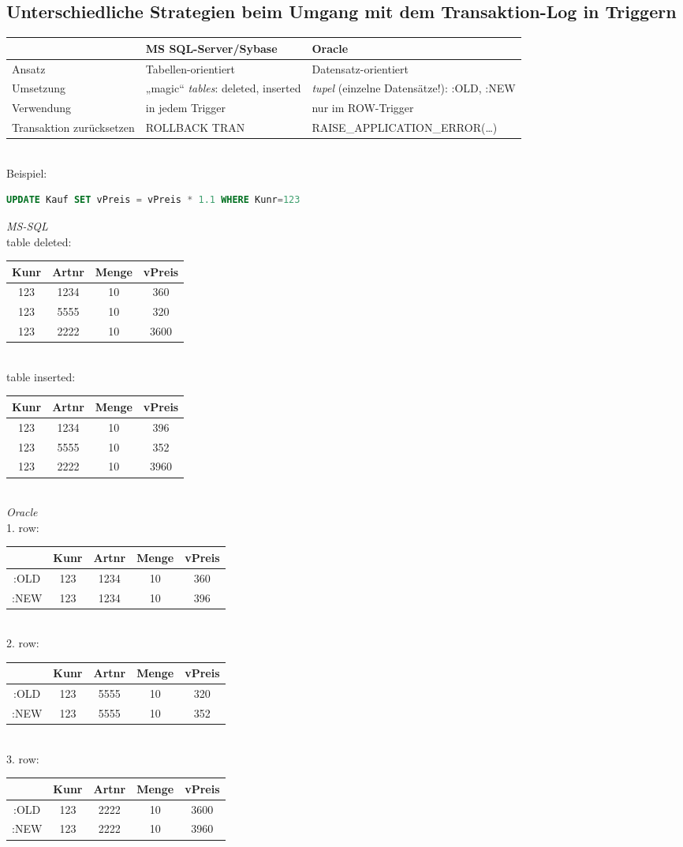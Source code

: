 \subsection{Unterschiedliche Strategien beim Umgang mit dem Transaktion-Log in Triggern}
\begin{tabular}{L{0.18} | l | l}
& MS SQL-Server/Sybase & Oracle\\\hline
Ansatz & Tabellen-orientiert & Datensatz-orientiert\\
Umsetzung & „magic“ \emph{tables}: deleted, inserted & \emph{tupel} (einzelne Datensätze!): :OLD, :NEW\\
Verwendung & in jedem Trigger & nur im ROW-Trigger\\
Transaktion zurücksetzen & ROLLBACK TRAN & RAISE\_APPLICATION\_ERROR(…)
\end{tabular}\bigskip\\
Beispiel:
\begin{lstlisting}[language=SQL]
UPDATE Kauf SET vPreis = vPreis * 1.1 WHERE Kunr=123
\end{lstlisting}
\emph{MS-SQL}\\
table deleted:\\
\begin{tabular}{c | c | c | c}
Kunr & Artnr & Menge & vPreis\\\hline
123 & 1234 & 10 & 360\\
123 & 5555 & 10 & 320\\
123 & 2222 & 10 & 3600\\
\end{tabular}\\
table inserted:\\
\begin{tabular}{c | c | c | c}
Kunr & Artnr & Menge & vPreis\\\hline
123 & 1234 & 10 & 396\\
123 & 5555 & 10 & 352\\
123 & 2222 & 10 & 3960\\
\end{tabular}\bigskip\\
\emph{Oracle}\\
1. row:\\
\begin{tabular}{c | c | c | c | c}
&Kunr & Artnr & Menge & vPreis\\\hline
:OLD & 123 & 1234 & 10 & 360\\
:NEW & 123 & 1234 & 10 & 396
\end{tabular}\\
2. row:\\
\begin{tabular}{c | c | c | c | c}
&Kunr & Artnr & Menge & vPreis\\\hline
:OLD & 123 & 5555 & 10 & 320\\
:NEW & 123 & 5555 & 10 & 352
\end{tabular}\\
3. row:\\
\begin{tabular}{c | c | c | c | c}
&Kunr & Artnr & Menge & vPreis\\\hline
:OLD & 123 & 2222 & 10 & 3600\\
:NEW & 123 & 2222 & 10 & 3960
\end{tabular}

